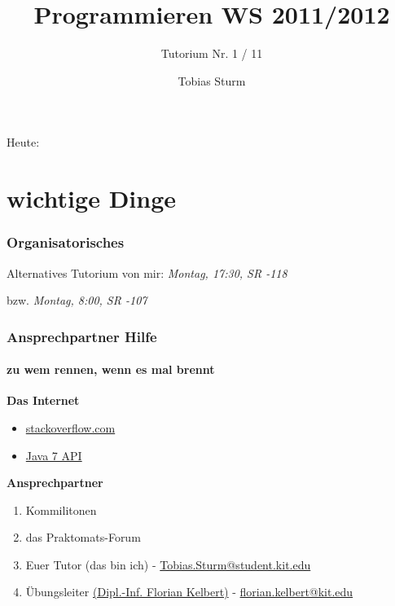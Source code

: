 \documentclass[18pt]{beamer}
\title[Proggen WS11/12]{Programmieren WS 2011/2012}
\subtitle{Tutorium Nr. 1 / 11}
\author{Tobias Sturm} %
\institute{Zertifizierbare Vertrauenswürdige Informatiksysteme}
\date[23.1.12] %
\begin{document}


\begin{frame}
	\titlepage
\end{frame}


\begin{frame}{Heute:}
	\tableofcontents
\end{frame}



\section{wichtige Dinge}

\begin{frame}
	\frametitle{Organisatorisches}
	Alternatives Tutorium von mir: \emph{Montag, 17:30, SR -118}
	
	bzw. \emph{Montag, 8:00, SR -107}
\end{frame}

\begin{frame}
	\frametitle{Ansprechpartner Hilfe}
	\framesubtitle{zu wem rennen, wenn es mal brennt}
	
	\textbf{Das Internet}
	\begin{itemize}
		\item \href{http://stackoverflow.com/}{stackoverflow.com}
		\item \href{http://download.oracle.com/javase/7/docs/api/}{Java 7 API}
	\end{itemize}
	
	\pause
	
	\textbf{Ansprechpartner}
	\begin{enumerate}
		\item Kommilitonen
		\item das Praktomats-Forum
		\item Euer Tutor (das bin ich) - \href{mailto:Tobias.Sturm@student.kit.edu}{Tobias.Sturm@student.kit.edu}
		\item Übungsleiter \href{https://zvi.ipd.kit.edu/21_kelbert.php}{(Dipl.-Inf. Florian Kelbert)} - \href{mailto:florian.kelbert@kit.edu}{florian.kelbert@kit.edu}
	\end{enumerate}
\end{frame}
\end{document}
